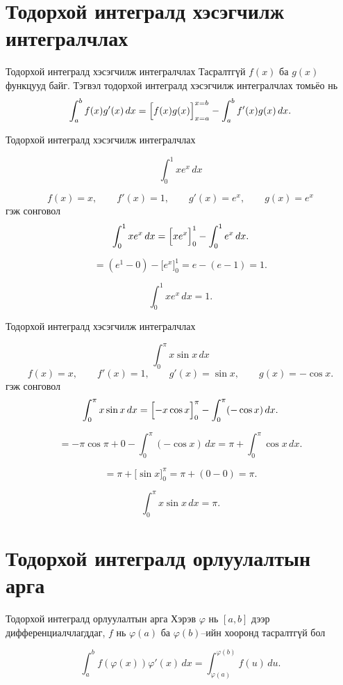 \section{Тодорхой интегралд хэсэгчилж интегралчлах}
\begin{frame}[allowframebreaks]{Тодорхой интегралд хэсэгчилж интегралчлах}
Тасралтгүй $f(x)$ ба $g(x)$ функцууд байг. Тэгвэл тодорхой интегралд 
хэсэгчилж интегралчлах томьёо нь
\[
\int_a^b f(x)g'(x)\,dx
=
\Bigl[f(x)g(x)\Bigr]_{x=a}^{x=b}-\int_a^b f'(x)g(x)\,dx .
\]
\end{frame}

\begin{frame}[allowframebreaks]{Тодорхой интегралд хэсэгчилж интегралчлах}
\begin{example}
\[
\int_0^1 x e^x\,dx
\]
 
\[
f(x)=x,\qquad f'(x)=1,\qquad g'(x)=e^x,\qquad g(x)=e^x
\] гэж сонговол
\[
\int_0^1 x e^x\,dx
=
\Bigl[x e^x\Bigr]_0^1-\int_0^1 e^x\,dx.
\]

\[
=
(e^1-0)-\bigl[e^x\bigr]_0^1
=
e-(e-1)=1.
\]

\[
\boxed{\displaystyle\int_0^1 x e^x\,dx=1.}
\]
\end{example}
\end{frame}

\begin{frame}[allowframebreaks]{Тодорхой интегралд хэсэгчилж интегралчлах}
\begin{example}
\[
\int_0^\pi x\sin x\,dx
\]
\[
f(x)=x,\qquad f'(x)=1,\qquad g'(x)=\sin x,\qquad g(x)=-\cos x.
\]
гэж сонговол
\[
\int_0^\pi x\sin x\,dx
=
\Bigl[-x\cos x\Bigr]_0^\pi
-
\int_0^\pi (-\cos x)\,dx.
\]

\[
=-\pi\cos\pi+0-\int_0^\pi (-\cos x)\,dx
=\pi+\int_0^\pi \cos x\,dx.
\]

\[
=\pi+\bigl[\sin x\bigr]_0^\pi
=\pi+(0-0)=\pi.
\]

\[
\boxed{\displaystyle\int_0^\pi x\sin x\,dx=\pi.}
\]
    
\end{example}
\end{frame}

\section{Тодорхой интегралд орлуулалтын арга}
\begin{frame}[allowframebreaks]{Тодорхой интегралд орлуулалтын арга}
Хэрэв $\varphi$ нь $[a,b]$ дээр дифференциалчлагддаг, 
$f$ нь $\varphi(a)$ ба $\varphi(b)$--ийн хооронд тасралтгүй бол

\[
\int_a^b f(\varphi(x))\varphi'(x)\,dx
=
\int_{\varphi(a)}^{\varphi(b)} f(u)\,du.
\]
\end{frame}

